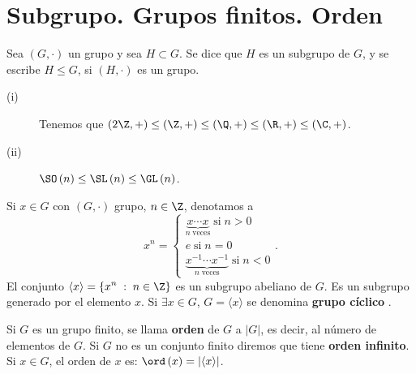 \section{Subgrupo. Grupos finitos. Orden}

\begin{fdefinition}[]
\normalfont Sea $\displaystyle \left(G, \cdot\right) $ un grupo y sea $\displaystyle H\subset G $. Se dice que $\displaystyle H $ es un subgrupo de $\displaystyle G $, y se escribe $\displaystyle H \leq G $, si $\displaystyle \left(H, \cdot\right) $ es un grupo.
\end{fdefinition}

\begin{eg}
\normalfont 
\begin{description}
\item[(i)] Tenemos que $\displaystyle \left(2\Z, + \right) \leq \left(\Z, +\right) \leq \left(\Q, +\right) \leq \left(\R, +\right) \leq \left(\C, +\right) $. 
\item[(ii)] $\displaystyle \SO\left(n\right) \leq \SL\left(n\right) \leq \GL\left(n\right) $.
\end{description}
\end{eg}

\begin{fdefinition}[]
\normalfont Si $\displaystyle x \in G $ con $\displaystyle \left(G, \cdot \right) $ grupo, $\displaystyle n \in \Z $, denotamos a 
\[x^{n} =
\begin{cases}
	\underbrace{x \cdots x}_{n \; \text{veces}} \; \text{si} \; n > 0\\
	e \; \text{si} \; n = 0 \\
	\underbrace{x^{-1} \cdots x^{-1}}_{n \; \text{veces}} \; \text{si} \; n < 0
\end{cases}
.\]
El conjunto $\displaystyle \langle x \rangle = \left\{ x^{n} \; : \; n \in \Z\right\}  $ es un subgrupo abeliano de $\displaystyle G $. Es un subgrupo generado por el elemento $\displaystyle x $. Si $\displaystyle \exists x \in G $, $\displaystyle G = \langle x \rangle $ se denomina \textbf{grupo cíclico} . 
\end{fdefinition}

\begin{fdefinition}[Orden]
\normalfont Si $\displaystyle G $ es un grupo finito, se llama \textbf{orden} de $\displaystyle G $ a $\displaystyle \left|G\right| $, es decir, al número de elementos de $\displaystyle G $. Si $\displaystyle G $ no es un conjunto finito diremos que tiene \textbf{orden infinito}. Si $\displaystyle x \in G $, el orden de $\displaystyle x $ es: $\displaystyle \ord\left(x\right) = \left|\langle x \rangle\right| $.
\end{fdefinition}

